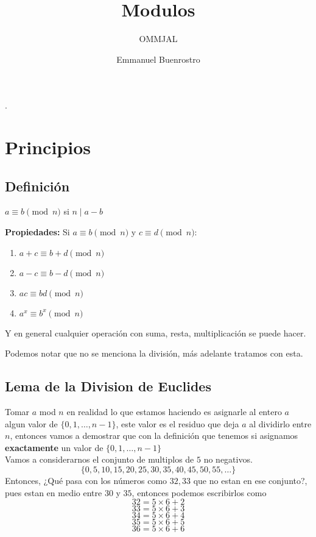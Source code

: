 \documentclass[11pt]{scrartcl}
\title{Modulos}
\subtitle{OMMJAL}
\author{Emmanuel Buenrostro}
\begin{document}
\maketitle.


\section{Principios}
\subsection{Definici\'on}

\begin{definition}
$a \equiv b \pmod n$ si $n\mid a-b$ 
\end{definition}
\textbf{ Propiedades:}
Si $a\equiv b \pmod n$ y $c \equiv d \pmod n$:
\begin{enumerate}
\item $a+c\equiv b+d  \pmod n$
\item $a-c \equiv b-d \pmod n$
\item $ac \equiv bd \pmod n$
\item $a^x\equiv b^x \pmod n$
\end{enumerate}
Y en general cualquier operaci\'on con suma, resta, multiplicaci\'on se puede hacer.

\begin{remark*}
Podemos notar que no se menciona la divisi\'on, m\'as adelante tratamos con esta.
\end{remark*}

\subsection{Lema de la Division de Euclides}
Tomar $a$ mod $n$ en realidad lo que estamos haciendo es asignarle al entero $a$ algun valor de $\{0,1, \ldots, n-1\}$, este valor es el residuo que deja $a$ al dividirlo entre $n$, entonces vamos a demostrar que con la definici\'on que tenemos si asignamos \textbf{exactamente} un valor de  $\{0,1, \ldots, n-1\}$ \\

Vamos a considerarnos el conjunto de multiplos de $5$ no negativos.
\[\{ 0,5,10,15,20,25,30,35,40,45,50,55, \ldots \}\]
Entonces, ¿Qu\'e pasa con los n\'umeros como $32, 33$ que no estan en ese conjunto?, pues estan en medio entre $30$ y $35$, entonces podemos escribirlos como
\[32 = 5 \times 6 + 2\]
\[33 = 5 \times 6 + 3\]
\[34 = 5 \times 6 + 4\]
\[35 = 5 \times 6 + 5\]
\[36 = 5 \times 6 + 6\]
\end{document}
